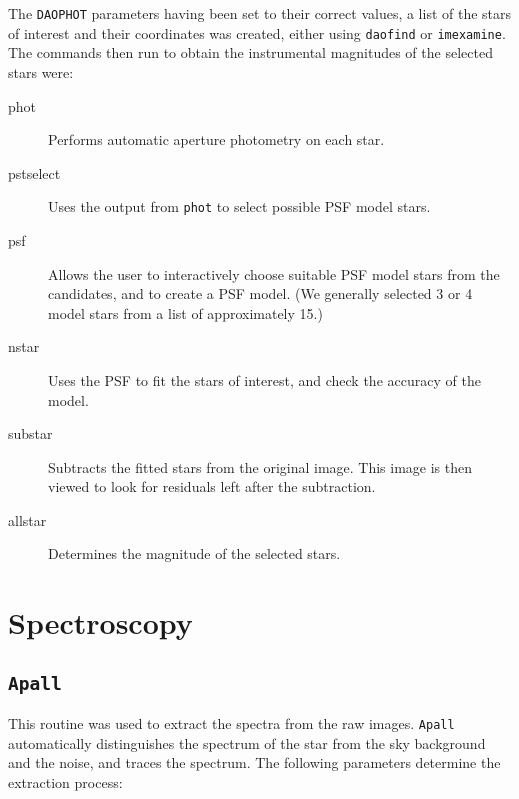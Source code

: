 The \texttt{DAOPHOT} parameters having been set to their correct
values, a list of the stars of interest and their coordinates was
created, either using \texttt{daofind} or \texttt{imexamine}. The
commands then run to obtain the instrumental magnitudes
of the selected stars were:%

\begin{description}

\item[phot]
Performs automatic aperture photometry on each star. %

\item[pstselect]
Uses the output from \texttt{phot} to select possible PSF model
stars. %

\item[psf]
Allows the user to interactively choose suitable PSF model stars from
the candidates, and to create a PSF model. (We generally selected 3 or
4 model stars from a list of approximately 15.) %

\item[nstar]
Uses the PSF to fit the stars of interest, and check the accuracy of
the model. %

\item[substar]
Subtracts the fitted stars from the original image. This image is then
viewed to look for residuals left after the subtraction. %

\item[allstar]
Determines the magnitude of the selected stars. %

\end{description}


\section{Spectroscopy}\label{cha:IRAF:sec:Spectroscopy}


\subsection{\texttt{Apall}}\label{cha:IRAF:sec:Spectroscopy:subsec:apall}

This routine was used to extract the spectra from the raw
images. \texttt{Apall} automatically distinguishes the spectrum of the
star from the sky background and the noise, and traces the
spectrum. The following parameters determine the extraction process: %

